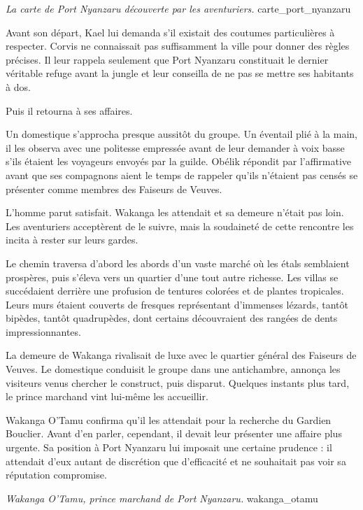 {\textit{La carte de Port Nyanzaru découverte par les aventuriers.}}
{carte_port_nyanzaru}

Avant son départ, Kael lui demanda s'il existait des coutumes particulières à respecter. Corvis ne connaissait pas suffisamment la ville pour donner des règles précises. Il leur rappela seulement que Port Nyanzaru constituait le dernier véritable refuge avant la jungle et leur conseilla de ne pas se mettre ses habitants à dos.

Puis il retourna à ses affaires.

Un domestique s'approcha presque aussitôt du groupe. Un éventail plié à la main, il les observa avec une politesse empressée avant de leur demander à voix basse s'ils étaient les voyageurs envoyés par la guilde. Obélik répondit par l'affirmative avant que ses compagnons aient le temps de rappeler qu'ils n'étaient pas censés se présenter comme membres des Faiseurs de Veuves.

L'homme parut satisfait. Wakanga les attendait et sa demeure n'était pas loin. Les aventuriers acceptèrent de le suivre, mais la soudaineté de cette rencontre les incita à rester sur leurs gardes.

\scenebreak

Le chemin traversa d'abord les abords d'un vaste marché où les étals semblaient prospères, puis s'éleva vers un quartier d'une tout autre richesse. Les villas se succédaient derrière une profusion de tentures colorées et de plantes tropicales. Leurs murs étaient couverts de fresques représentant d'immenses lézards, tantôt bipèdes, tantôt quadrupèdes, dont certains découvraient des rangées de dents impressionnantes.

La demeure de Wakanga rivalisait de luxe avec le quartier général des Faiseurs de Veuves. Le domestique conduisit le groupe dans une antichambre, annonça les visiteurs venus chercher le construct, puis disparut. Quelques instants plus tard, le prince marchand vint lui-même les accueillir.

Wakanga O'Tamu confirma qu'il les attendait pour la recherche du Gardien Bouclier. Avant d'en parler, cependant, il devait leur présenter une affaire plus urgente. Sa position à Port Nyanzaru lui imposait une certaine prudence : il attendait d'eux autant de discrétion que d'efficacité et ne souhaitait pas voir sa réputation compromise.

{\textit{Wakanga O'Tamu, prince marchand de Port Nyanzaru.}}
{wakanga_otamu}

